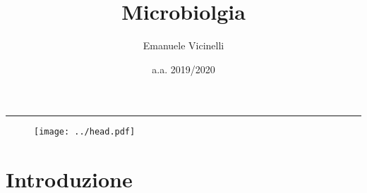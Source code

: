 \documentclass[italian,]{article}
\date{}
\begin{document}

\title{Microbiolgia}
\author{Emanuele Vicinelli}
\date{a.a. 2019/2020}

\maketitle

\begin{center}\rule{0.5\linewidth}{\linethickness}\end{center}

\begin{figure}[H]
\vspace{2cm}
\centering
\texttt{[image: ../head.pdf]}
\end{figure}

\thispagestyle{fancy}
\fancyhead{}
\fancyfoot{}
\renewcommand{\headrulewidth}{0pt}
\rfoot{\today}

\restoregeometry

\newpage

\tableofcontents

\newpage

\hypertarget{introduzione}{%
\section*{Introduzione}\label{introduzione}}
\end{document}
